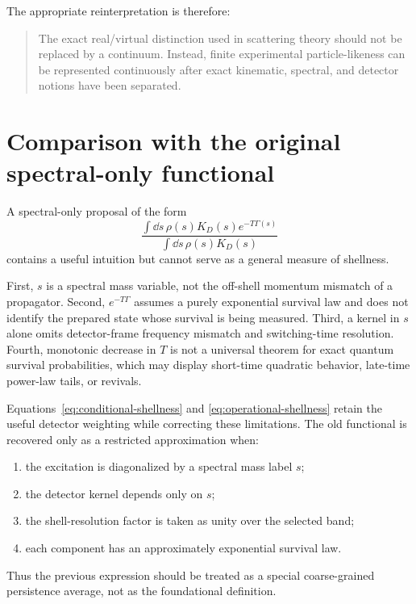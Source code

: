 \documentclass[11pt]{article}
\theoremstyle{remark}
\begin{document}
The appropriate reinterpretation is therefore:
\begin{quote}
The exact real/virtual distinction used in scattering theory should not be replaced by a continuum. Instead, finite experimental particle-likeness can be represented continuously after exact kinematic, spectral, and detector notions have been separated.
\end{quote}

\section{Comparison with the original spectral-only functional}

A spectral-only proposal of the form
\begin{equation}
  \frac{\int \dd s\,\rho(s)K_D(s)e^{-T\Gamma(s)}}
  {\int \dd s\,\rho(s)K_D(s)}
  \label{eq:old-functional}
\end{equation}
contains a useful intuition but cannot serve as a general measure of shellness.

First, $s$ is a spectral mass variable, not the off-shell momentum mismatch of a propagator. Second, $e^{-T\Gamma}$ assumes a purely exponential survival law and does not identify the prepared state whose survival is being measured. Third, a kernel in $s$ alone omits detector-frame frequency mismatch and switching-time resolution. Fourth, monotonic decrease in $T$ is not a universal theorem for exact quantum survival probabilities, which may display short-time quadratic behavior, late-time power-law tails, or revivals.

Equations~\eqref{eq:conditional-shellness} and \eqref{eq:operational-shellness} retain the useful detector weighting while correcting these limitations. The old functional is recovered only as a restricted approximation when:
\begin{enumerate}[label=(\roman*)]
  \item the excitation is diagonalized by a spectral mass label $s$;
  \item the detector kernel depends only on $s$;
  \item the shell-resolution factor is taken as unity over the selected band;
  \item each component has an approximately exponential survival law.
\end{enumerate}
Thus the previous expression should be treated as a special coarse-grained persistence average, not as the foundational definition.
\end{document}
